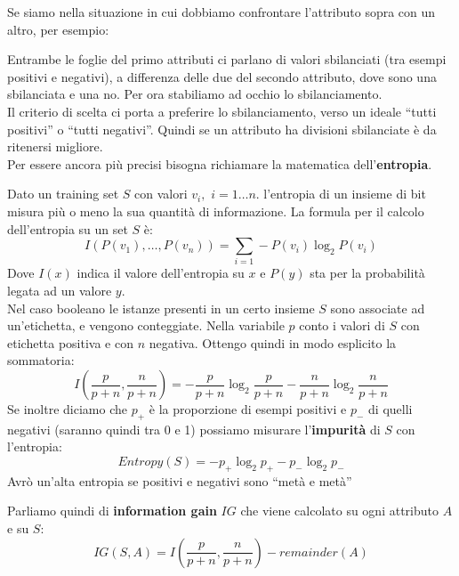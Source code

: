 Se siamo nella situazione in cui dobbiamo confrontare l'attributo sopra con un
altro, per esempio:
\begin{figure}[H]
  \centering
\end{figure}
Entrambe le foglie del primo attributi ci parlano di valori sbilanciati (tra
esempi positivi e negativi), a differenza delle due del secondo attributo, dove
sono una sbilanciata e una no. Per ora stabiliamo ad occhio lo sbilanciamento.\\
Il criterio di scelta ci porta a preferire lo sbilanciamento, verso un ideale
``tutti positivi'' o ``tutti negativi''. Quindi se un attributo ha divisioni
sbilanciate è da ritenersi migliore.\\ 
Per essere ancora più precisi bisogna richiamare la matematica
dell'\textbf{entropia}.
\begin{definizione}
  Dato un training set $S$ con valori $v_i,\,\,i=1\ldots n$. l'entropia di un
  insieme di bit misura più o meno la sua quantità di informazione. La formula per il calcolo dell'entropia su un set $S$ è:
  \[I(P(v_1),\ldots,P(v_n))=\sum_{i=1}-P(v_i)\log_2P(v_i)\]
  Dove $I(x)$ indica il valore dell'entropia su $x$ e $P(y)$ sta per la
  probabilità legata ad un valore $y$.  \\
  Nel caso booleano le istanze presenti in un certo insieme $S$ sono associate
  ad un'etichetta, e vengono conteggiate. Nella variabile $p$ conto i valori di $S$ con
  etichetta positiva e con $n$ negativa. Ottengo
  quindi in modo esplicito la sommatoria:
  \[I\left(\frac{p}{p+n},\frac{n}{p+n}\right)=-\frac{p}{p+n}\log_2\frac{p}{p+n}
    -\frac{n}{p+n}\log_2\frac{n}{p+n}\]  
  Se inoltre diciamo che $p_+$ è la proporzione di esempi positivi e $p_-$ di
  quelli negativi (saranno quindi tra 0 e 1) possiamo misurare
  l'\textbf{impurità} di $S$ con l'entropia: 
  \[Entropy(S)=-p_+\log_2 p_+-p_-\log_2 p_-\]
  Avrò un'alta entropia se positivi e negativi sono ``metà e metà''
\end{definizione}
Parliamo quindi di \textbf{information gain} $IG$ che viene calcolato su ogni
attributo $A$ e su $S$:
\[IG(S,A)=I\left(\frac{p}{p+n},\frac{n}{p+n}\right)-remainder(A)\]
